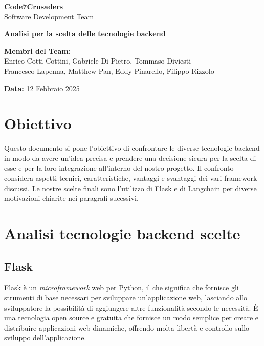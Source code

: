\documentclass{article}
\begin{document}
\begin{titlepage}
    {\Huge \textbf{Code7Crusaders}}\\
    \vspace{0.5cm}
    {\Large Software Development Team}\\
    \vspace{2cm}
    
    {\large \textbf{Analisi per la scelta delle tecnologie backend}}\\
    \vspace{5cm}

    \textbf{Membri del Team:}\\
    Enrico Cotti Cottini, Gabriele Di Pietro, Tommaso Diviesti \\
    Francesco Lapenna, Matthew Pan, Eddy Pinarello, Filippo Rizzolo \\
    \vspace{0.5cm}
    
    {\large \textbf{Data:}} 12 Febbraio 2025\\
    
    \vspace{1cm}
\end{titlepage}
\clearpage

\newpage
\tableofcontents
\listoftables
\newpage

\section{Obiettivo}
Questo documento si pone l'obiettivo di confrontare le diverse 
tecnologie backend in modo da avere un'idea precisa e prendere 
una decisione sicura per la scelta di esse e per la loro integrazione 
all'interno del nostro progetto. Il confronto considera aspetti 
tecnici, caratteristiche, vantaggi e svantaggi dei vari framework 
discussi. Le nostre scelte finali sono l'utilizzo di Flask e di 
Langchain per diverse motivazioni chiarite nei paragrafi sucessivi.

\section{Analisi tecnologie backend scelte}

\subsection{Flask}
Flask è un \textit{microframework} web per Python, il che significa 
che fornisce gli strumenti di base necessari per sviluppare 
un'applicazione web, lasciando allo sviluppatore la possibilità di 
aggiungere altre funzionalità secondo le necessità. È una tecnologia 
open source e gratuita che fornisce un modo semplice per creare e 
distribuire applicazioni web dinamiche, offrendo molta libertà e 
controllo sullo sviluppo dell’applicazione.
\end{document}
